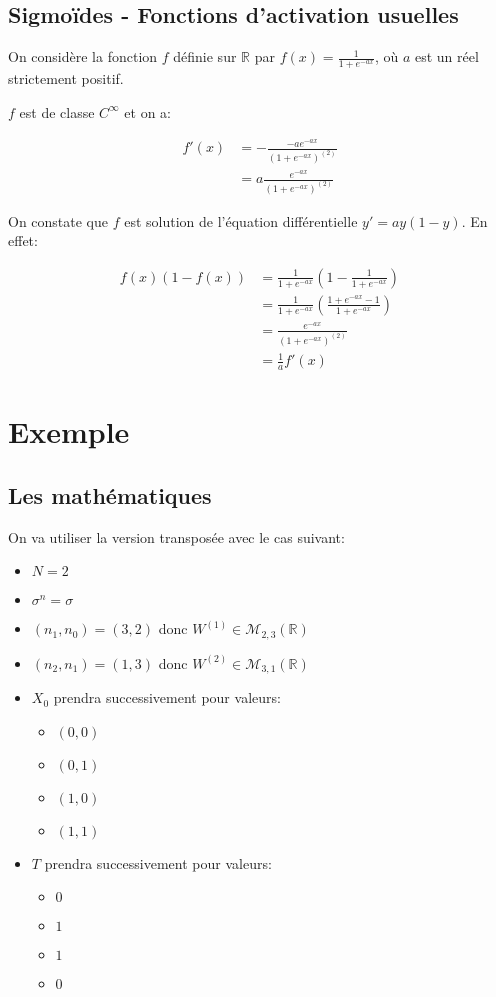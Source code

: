 \documentclass[11pt]{article}
\begin{document}
{\subsection{Sigmoïdes - Fonctions d'activation usuelles}
\label{sec-6-2}

On considère la fonction $f$ définie sur $\mathbb{R}$ par
$f(x)=\frac{1}{1+e^{-ax}}$, où $a$ est un réel strictement positif.

$f$ est de classe $C^{\infty}$ et on a:

\begin{align}
f'(x) & = -\frac{-ae^{-ax}}{(1+e^{-ax})^{(2)}}\\
& = a\frac{e^{-ax}}{(1+e^{-ax})^{(2)}}
\end{align}

On constate que $f$ est solution de l'équation différentielle $y'=ay(1-y)$. En
effet:

\begin{align}
f(x)(1-f(x)) & = \frac{1}{1+e^{-ax}}(1-\frac{1}{1+e^{-ax}})\\
& = \frac{1}{1+e^{-ax}}(\frac{1+e^{-ax}-1}{1+e^{-ax}})\\
& = \frac{e^{-ax}}{(1+e^{-ax})^{(2)}}\\
& = \frac{1}{a}f'(x)
\end{align}

\section{Exemple}
\label{sec-7}

\subsection{Les mathématiques}
\label{sec-7-1}

On va utiliser la version transposée avec le cas suivant:
\begin{itemize}
\item $N=2$
\item $\sigma^{n}=\sigma$
\item $(n_{1}, n_{0})=(3,2)$ donc $W^{(1)}\in\mathcal{M}_{2,3}(\mathbb{R})$
\item $(n_{2}, n_{1})=(1,3)$ donc $W^{(2)}\in\mathcal{M}_{3,1}(\mathbb{R})$
\item $X_{0}$ prendra successivement pour valeurs:
\begin{itemize}
\item $(0,0)$
\item $(0,1)$
\item $(1,0)$
\item $(1,1)$
\end{itemize}
\item $T$ prendra successivement pour valeurs:
\begin{itemize}
\item $0$
\item $1$
\item $1$
\item $0$
\end{itemize}
\end{itemize}

}
\end{document}
